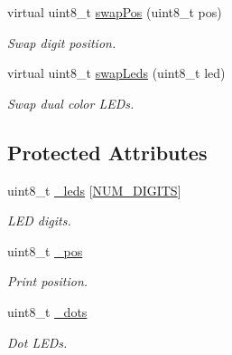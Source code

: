 \begin{DoxyCompactItemize}
virtual uint8\+\_\+t \hyperlink{class_l_k_m1638_board_a36bc06324f7f4bb412d42338e4adfb18}{swap\+Pos} (uint8\+\_\+t pos)
\begin{DoxyCompactList}\small\item\em Swap digit position. \end{DoxyCompactList}\item 
virtual uint8\+\_\+t \hyperlink{class_l_k_m1638_board_a9526953f337a0f5780c963f5e37a77d3}{swap\+Leds} (uint8\+\_\+t led)
\begin{DoxyCompactList}\small\item\em Swap dual color L\+ED\textquotesingle{}s. \end{DoxyCompactList}\end{DoxyCompactItemize}
\subsection*{Protected Attributes}
\begin{DoxyCompactItemize}
\item 
uint8\+\_\+t \hyperlink{class_l_k_m1638_board_ad0ecb25b0069693153b4c99b1fd0c0c6}{\+\_\+leds} \mbox{[}\hyperlink{_l_k_m1638_board_8h_a0b79fa1bdb1363440df485691386a74c}{N\+U\+M\+\_\+\+D\+I\+G\+I\+TS}\mbox{]}\hypertarget{class_l_k_m1638_board_ad0ecb25b0069693153b4c99b1fd0c0c6}{}\label{class_l_k_m1638_board_ad0ecb25b0069693153b4c99b1fd0c0c6}

\begin{DoxyCompactList}\small\item\em L\+ED digits. \end{DoxyCompactList}\item 
uint8\+\_\+t \hyperlink{class_l_k_m1638_board_a1dc0720aa961510a147cb7e3db7d7873}{\+\_\+pos}\hypertarget{class_l_k_m1638_board_a1dc0720aa961510a147cb7e3db7d7873}{}\label{class_l_k_m1638_board_a1dc0720aa961510a147cb7e3db7d7873}

\begin{DoxyCompactList}\small\item\em Print position. \end{DoxyCompactList}\item 
uint8\+\_\+t \hyperlink{class_l_k_m1638_board_a2de77cd6c33672edb5a3288b09cdcbfc}{\+\_\+dots}\hypertarget{class_l_k_m1638_board_a2de77cd6c33672edb5a3288b09cdcbfc}{}\label{class_l_k_m1638_board_a2de77cd6c33672edb5a3288b09cdcbfc}

\begin{DoxyCompactList}\small\item\em Dot L\+ED\textquotesingle{}s. \end{DoxyCompactList}\end{DoxyCompactItemize}


